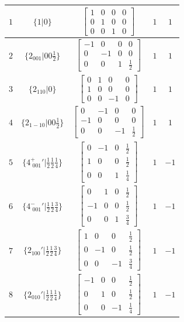 \documentclass[fleqn,8pt]{jsarticle}
\begin{document}
\begin{longtable}{ccccc}
$ 1 $ & $ \{1|0\} $ & $ \begin{bmatrix} 1 & 0 & 0 & 0 \\ 0 & 1 & 0 & 0 \\ 0 & 0 & 1 & 0 \end{bmatrix} $ & $ 1 $ & $ 1 $ \\ \hline
$ 2 $ & $ \{2{}_{001}|0 0 \frac{1}{2}\} $ & $ \begin{bmatrix} -1 & 0 & 0 & 0 \\ 0 & -1 & 0 & 0 \\ 0 & 0 & 1 & \frac{1}{2} \end{bmatrix} $ & $ 1 $ & $ 1 $ \\ \hline
$ 3 $ & $ \{2{}_{110}|0\} $ & $ \begin{bmatrix} 0 & 1 & 0 & 0 \\ 1 & 0 & 0 & 0 \\ 0 & 0 & -1 & 0 \end{bmatrix} $ & $ 1 $ & $ 1 $ \\ \hline
$ 4 $ & $ \{2{}_{1-10}|0 0 \frac{1}{2}\} $ & $ \begin{bmatrix} 0 & -1 & 0 & 0 \\ -1 & 0 & 0 & 0 \\ 0 & 0 & -1 & \frac{1}{2} \end{bmatrix} $ & $ 1 $ & $ 1 $ \\ \hline
$ 5 $ & $ \{4^{+}_{\,\,001}{}'|\frac{1}{2} \frac{1}{2} \frac{1}{4}\} $ & $ \begin{bmatrix} 0 & -1 & 0 & \frac{1}{2} \\ 1 & 0 & 0 & \frac{1}{2} \\ 0 & 0 & 1 & \frac{1}{4} \end{bmatrix} $ & $ 1 $ & $ -1 $ \\ \hline
$ 6 $ & $ \{4^{-}_{\,\,001}{}'|\frac{1}{2} \frac{1}{2} \frac{3}{4}\} $ & $ \begin{bmatrix} 0 & 1 & 0 & \frac{1}{2} \\ -1 & 0 & 0 & \frac{1}{2} \\ 0 & 0 & 1 & \frac{3}{4} \end{bmatrix} $ & $ 1 $ & $ -1 $ \\ \hline
$ 7 $ & $ \{2{}_{100}{}'|\frac{1}{2} \frac{1}{2} \frac{3}{4}\} $ & $ \begin{bmatrix} 1 & 0 & 0 & \frac{1}{2} \\ 0 & -1 & 0 & \frac{1}{2} \\ 0 & 0 & -1 & \frac{3}{4} \end{bmatrix} $ & $ 1 $ & $ -1 $ \\ \hline
$ 8 $ & $ \{2{}_{010}{}'|\frac{1}{2} \frac{1}{2} \frac{1}{4}\} $ & $ \begin{bmatrix} -1 & 0 & 0 & \frac{1}{2} \\ 0 & 1 & 0 & \frac{1}{2} \\ 0 & 0 & -1 & \frac{1}{4} \end{bmatrix} $ & $ 1 $ & $ -1 $ \\
\end{longtable}
\end{document}
